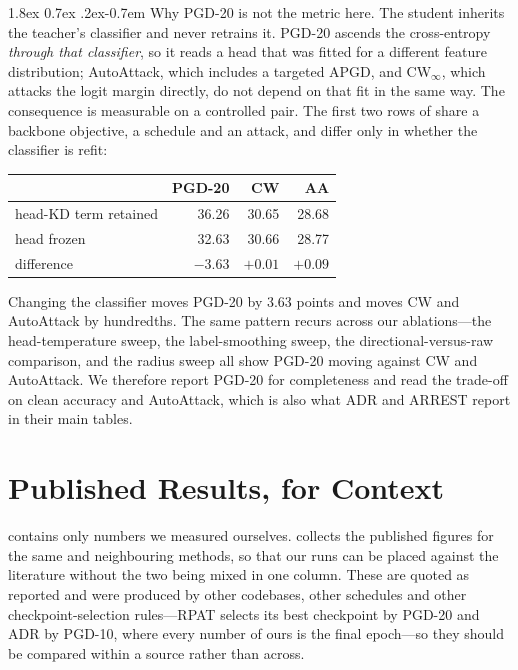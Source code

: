 \documentclass{article} %
\makeatletter
\theoremstyle{plain}
\renewcommand{\paragraph}{\@startsection{paragraph}{4}{\z@}%
  {1.8ex \@plus 0.7ex \@minus .2ex}{-0.7em}%
  {\normalfont\normalsize\bfseries}}
\makeatother
\begin{document}
\paragraph{Why PGD-20 is not the metric here.} The student inherits the teacher's classifier and never
retrains it. PGD-20 ascends the cross-entropy \emph{through that classifier}, so it reads a head that
was fitted for a different feature distribution; AutoAttack, which includes a targeted APGD, and
CW$_\infty$, which attacks the logit margin directly, do not depend on that fit in the same way. The
consequence is measurable on a controlled pair. The first two rows of  share a
backbone objective, a schedule and an attack, and differ only in whether the classifier is refit:

\begin{center}
\begin{tabular}{lrrr}
  \toprule
  & PGD-20 & CW & AA \\
  \midrule
  head-KD term retained & 36.26 & 30.65 & 28.68 \\
  head frozen           & 32.63 & 30.66 & 28.77 \\
  \midrule
  difference            & $-3.63$ & $+0.01$ & $+0.09$ \\
  \bottomrule
\end{tabular}
\end{center}

Changing the classifier moves PGD-20 by $3.63$ points and moves CW and AutoAttack by hundredths. The
same pattern recurs across our ablations---the head-temperature sweep, the label-smoothing sweep, the
directional-versus-raw comparison, and the radius sweep all show PGD-20 moving against CW and
AutoAttack. We therefore report PGD-20 for completeness and read the trade-off on clean accuracy and
AutoAttack, which is also what ADR and ARREST report in their main tables.

\section{Published Results, for Context}
\label{app:published}

 contains only numbers we measured ourselves.  collects the
published figures for the same and neighbouring methods, so that our runs can be placed against the
literature without the two being mixed in one column. These are quoted as reported and were produced
by other codebases, other schedules and other checkpoint-selection rules---RPAT selects its best
checkpoint by PGD-20 and ADR by PGD-10, where every number of ours is the final epoch---so they should
be compared within a source rather than across.
\end{document}
